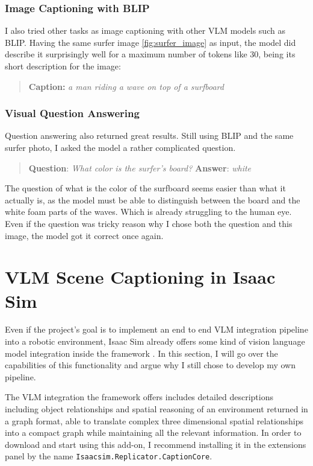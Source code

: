 \subsubsection{Image Captioning with BLIP}
I also tried other tasks as image captioning with other VLM models such as BLIP. Having the same surfer image \ref{fig:surfer_image} as input, the model did describe it surprisingly well for a maximum number of tokens like 30, being its short description for the image: 

\begin{quote}
	\textbf{Caption:} \textit{a man riding a wave on top of a surfboard}
\end{quote}

\subsubsection{Visual Question Answering}
Question answering also returned great results. Still using BLIP and the same surfer photo, I asked the model a rather complicated question. 

\begin{quote}
	\textbf{Question}: \textit{What color is the surfer's board?} \textbf{Answer}: \textit{white}
\end{quote}

The question of what is the color of the surfboard seems easier than what it actually is, as the model must be able to distinguish between the board and the white foam parts of the waves. Which is already struggling to the human eye. Even if the question was tricky reason why I chose both the question and this image, the model got it correct once again. 


\section{VLM Scene Captioning in Isaac Sim}
Even if the project's goal is to implement an end to end VLM integration pipeline into a robotic environment, Isaac Sim already offers some kind of vision language model integration inside the framework \cite{SceneCaptioning}. In this section, I will go over the capabilities of this functionality and argue why I still chose to develop my own pipeline. 

The VLM integration the framework offers includes detailed descriptions including object relationships and spatial reasoning of an environment returned in a graph format, able to translate complex three dimensional spatial relationships into a compact graph while maintaining all the relevant information. In order to download and start using this add-on, I recommend installing it in the extensions panel by the name \texttt{Isaacsim.Replicator.CaptionCore}.

